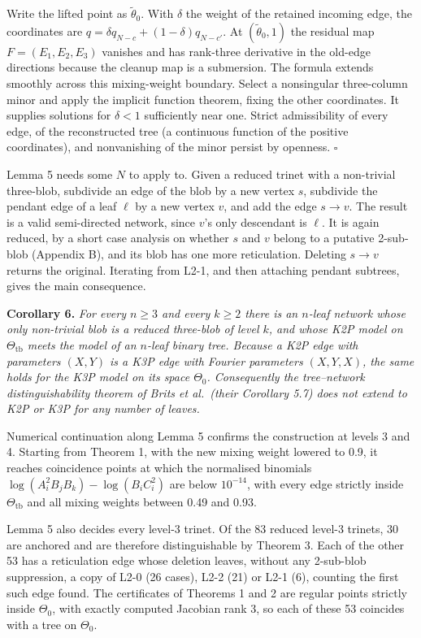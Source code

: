 \documentclass[
  11pt,
]{article}
\begin{document}
Write the lifted point as \(\widetilde\theta_0\). With \(\delta\) the
weight of the retained incoming edge, the coordinates are
\(q=\delta q_{N-c}+(1-\delta)q_{N-c'}\). At \((\widetilde\theta_0,1)\)
the residual map \(F=(E_1,E_2,E_3)\) vanishes and has rank-three
derivative in the old-edge directions because the cleanup map is a
submersion. The formula extends smoothly across this mixing-weight
boundary. Select a nonsingular three-column minor and apply the implicit
function theorem, fixing the other coordinates. It supplies solutions
for \(\delta<1\) sufficiently near one. Strict admissibility of every
edge, of the reconstructed tree (a continuous function of the positive
coordinates), and nonvanishing of the minor persist by openness.
\(\square\)

Lemma 5 needs some \(N\) to apply to. Given a reduced trinet with a
non-trivial three-blob, subdivide an edge of the blob by a new vertex
\(s\), subdivide the pendant edge of a leaf \(\ell\) by a new vertex
\(v\), and add the edge \(s\to v\). The result is a valid semi-directed
network, since \(v\)'s only descendant is \(\ell\). It is again reduced,
by a short case analysis on whether \(s\) and \(v\) belong to a putative
2-sub-blob (Appendix B), and its blob has one more reticulation.
Deleting \(s\to v\) returns the original. Iterating from L2-1, and then
attaching pendant subtrees, gives the main consequence.

\textbf{Corollary 6.} \emph{For every \(n\ge3\) and every \(k\ge2\)
there is an \(n\)-leaf network whose only non-trivial blob is a reduced
three-blob of level \(k\), and whose K2P model on
\(\Theta_{\mathrm{tb}}\) meets the model of an \(n\)-leaf binary tree.
Because a K2P edge with parameters \((X,Y)\) is a K3P edge with Fourier
parameters \((X,Y,X)\), the same holds for the K3P model on its space
\(\Theta_0\). Consequently the tree--network distinguishability theorem
of Brits et al.~(their Corollary 5.7) does not extend to K2P or K3P for
any number of leaves.}

Numerical continuation along Lemma 5 confirms the construction at levels
3 and 4. Starting from Theorem 1, with the new mixing weight lowered to
0.9, it reaches coincidence points at which the normalised binomials
\(\log(A_i^2B_jB_k)-\log(B_iC_i^2)\) are below \(10^{-14}\), with every
edge strictly inside \(\Theta_{\mathrm{tb}}\) and all mixing weights
between 0.49 and 0.93.

Lemma 5 also decides every level-3 trinet. Of the 83 reduced level-3
trinets, 30 are anchored and are therefore distinguishable by Theorem 3.
Each of the other 53 has a reticulation edge whose deletion leaves,
without any 2-sub-blob suppression, a copy of L2-0 (26 cases), L2-2 (21)
or L2-1 (6), counting the first such edge found. The certificates of
Theorems 1 and 2 are regular points strictly inside \(\Theta_0\), with
exactly computed Jacobian rank 3, so each of these 53 coincides with a
tree on \(\Theta_0\).
\end{document}
